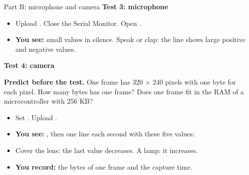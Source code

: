 \begin{frame}{Part B: microphone and camera}
  \small
  \textbf{Test 3: microphone}
  \begin{itemize}
    \item Upload . Close the Serial Monitor. Open
          .
    \item \textbf{You see:} small values in silence. Speak or clap: the line
          shows large positive and negative values.
  \end{itemize}
  \textbf{Test 4: camera}
  \begin{exerciseblock}
    \textbf{Predict before the test.} One frame has 320 $\times$ 240 pixels
    with one byte for each pixel. How many bytes has one frame? Does one
    frame fit in the RAM of a microcontroller with 256 KB?
  \end{exerciseblock}
  \begin{itemize}
    \item Set . Upload .
    \item \textbf{You see:} , then one line each
          second with these five values:
    \item Cover the lens: the last value decreases. A lamp: it increases.
    \item \textbf{You record:} the bytes of one frame and the capture time.
  \end{itemize}
\end{frame}


